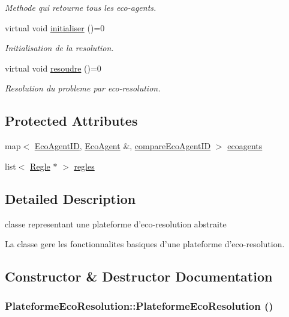 \begin{CompactItemize}
\begin{CompactList}\small\item\em Methode qui retourne tous les eco-agents. \item\end{CompactList}\item 
virtual void \hyperlink{classPlateformeEcoResolution_57d87139f09ca51cd6a4fa7cd2e83351}{initialiser} ()=0
\begin{CompactList}\small\item\em Initialisation de la resolution. \item\end{CompactList}\item 
virtual void \hyperlink{classPlateformeEcoResolution_17f587580cd8aee537551bc0ddd82bef}{resoudre} ()=0
\begin{CompactList}\small\item\em Resolution du probleme par eco-resolution. \item\end{CompactList}\end{CompactItemize}
\subsection*{Protected Attributes}
\begin{CompactItemize}
\item 
map$<$ \hyperlink{classEcoAgentID}{EcoAgentID}, \hyperlink{classEcoAgent}{EcoAgent} \&, \hyperlink{structcompareEcoAgentID}{compareEcoAgentID} $>$ \hyperlink{classPlateformeEcoResolution_02de97d0d9dac3719ceaadfb255492a3}{ecoagents}
\item 
list$<$ \hyperlink{classRegle}{Regle} $\ast$ $>$ \hyperlink{classPlateformeEcoResolution_4f7dc37edf042a189073f15771604e35}{regles}
\end{CompactItemize}


\subsection{Detailed Description}
classe representant une plateforme d'eco-resolution abstraite 

La classe gere les fonctionnalites basiques d'une plateforme d'eco-resolution. 

\subsection{Constructor \& Destructor Documentation}
\hypertarget{classPlateformeEcoResolution_6e03cc2c6a51bc4a47d2d226e41d13e9}{
\subsubsection[{PlateformeEcoResolution}]{\setlength{\rightskip}{0pt plus 5cm}PlateformeEcoResolution::PlateformeEcoResolution ()}}
\label{classPlateformeEcoResolution_6e03cc2c6a51bc4a47d2d226e41d13e9}


